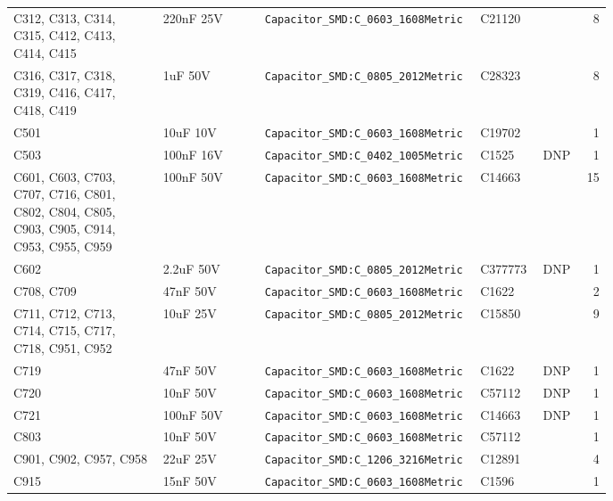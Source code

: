 {\begin{longtable}{@{}>{\raggedright\arraybackslash}p{0.25\linewidth}>{\raggedright\arraybackslash}p{0.17\linewidth}>{\raggedright\arraybackslash}p{0.36\linewidth}l l r@{}}
C312, C313, C314, C315, C412, C413, C414, C415 & 220nF 25V & \texttt{Capacitor\_\allowbreak{}SMD:\allowbreak{}C\_\allowbreak{}0603\_\allowbreak{}1608Metric} & C21120 &  & 8\\
C316, C317, C318, C319, C416, C417, C418, C419 & 1uF 50V & \texttt{Capacitor\_\allowbreak{}SMD:\allowbreak{}C\_\allowbreak{}0805\_\allowbreak{}2012Metric} & C28323 &  & 8\\
C501 & 10uF 10V & \texttt{Capacitor\_\allowbreak{}SMD:\allowbreak{}C\_\allowbreak{}0603\_\allowbreak{}1608Metric} & C19702 &  & 1\\
C503 & 100nF 16V & \texttt{Capacitor\_\allowbreak{}SMD:\allowbreak{}C\_\allowbreak{}0402\_\allowbreak{}1005Metric} & C1525 & DNP & 1\\
C601, C603, C703, C707, C716, C801, C802, C804, C805, C903, C905, C914, C953, C955, C959 & 100nF 50V & \texttt{Capacitor\_\allowbreak{}SMD:\allowbreak{}C\_\allowbreak{}0603\_\allowbreak{}1608Metric} & C14663 &  & 15\\
C602 & 2.2uF 50V & \texttt{Capacitor\_\allowbreak{}SMD:\allowbreak{}C\_\allowbreak{}0805\_\allowbreak{}2012Metric} & C377773 & DNP & 1\\
C708, C709 & 47nF 50V & \texttt{Capacitor\_\allowbreak{}SMD:\allowbreak{}C\_\allowbreak{}0603\_\allowbreak{}1608Metric} & C1622 &  & 2\\
C711, C712, C713, C714, C715, C717, C718, C951, C952 & 10uF 25V & \texttt{Capacitor\_\allowbreak{}SMD:\allowbreak{}C\_\allowbreak{}0805\_\allowbreak{}2012Metric} & C15850 &  & 9\\
C719 & 47nF 50V & \texttt{Capacitor\_\allowbreak{}SMD:\allowbreak{}C\_\allowbreak{}0603\_\allowbreak{}1608Metric} & C1622 & DNP & 1\\
C720 & 10nF 50V & \texttt{Capacitor\_\allowbreak{}SMD:\allowbreak{}C\_\allowbreak{}0603\_\allowbreak{}1608Metric} & C57112 & DNP & 1\\
C721 & 100nF 50V & \texttt{Capacitor\_\allowbreak{}SMD:\allowbreak{}C\_\allowbreak{}0603\_\allowbreak{}1608Metric} & C14663 & DNP & 1\\
C803 & 10nF 50V & \texttt{Capacitor\_\allowbreak{}SMD:\allowbreak{}C\_\allowbreak{}0603\_\allowbreak{}1608Metric} & C57112 &  & 1\\
C901, C902, C957, C958 & 22uF 25V & \texttt{Capacitor\_\allowbreak{}SMD:\allowbreak{}C\_\allowbreak{}1206\_\allowbreak{}3216Metric} & C12891 &  & 4\\
C915 & 15nF 50V & \texttt{Capacitor\_\allowbreak{}SMD:\allowbreak{}C\_\allowbreak{}0603\_\allowbreak{}1608Metric} & C1596 &  & 1\\

\end{longtable}}
